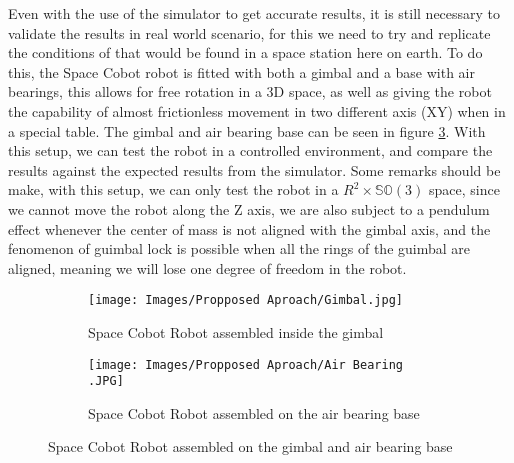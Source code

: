 Even with the use of the simulator to get accurate results, it is still necessary to validate the results in real world scenario, for this we need to try and replicate the conditions of that would be found in a space station here on earth. To do this, the Space Cobot robot is fitted with both a gimbal and a base with air bearings, this allows for free rotation in a 3D space, as well as giving the robot the capability of almost frictionless movement in two different axis (XY) when in a special table. The gimbal and air bearing base can be seen in figure \ref{fig:Proposed Approach: Real World: Gimbal and Air bearing base}. With this setup, we can test the robot in a controlled environment, and compare the results against the expected results from the simulator. Some remarks should be make, with this setup, we can only test the robot in a $R^2 \times \mathbb{SO}(3)$ space, since we cannot move the robot along the Z axis, we are also subject to a pendulum effect whenever the center of mass is not aligned with the gimbal axis, and the fenomenon of guimbal lock is possible when all the rings of the guimbal are aligned, meaning we will lose one degree of freedom in the robot.

\begin{figure}[H]
    \begin{subfigure}{0.5\textwidth}
       \centering
       \texttt{[image: Images/Propposed Aproach/Gimbal.jpg]} 
       \caption{Space Cobot Robot assembled inside the gimbal}
       \label{fig: Proposed Approach: Real World: Gimbal}
    \end{subfigure}
    \hfill
    \begin{subfigure}{.5\textwidth}
        \centering
        \texttt{[image: Images/Propposed Aproach/Air Bearing .JPG]}
        \caption{Space Cobot Robot assembled on the air bearing base}
        \label{fig: Proposed Approach: Real Word: Air Bearings}
    \end{subfigure}
    \caption{Space Cobot Robot assembled on the gimbal and air bearing base}
    \label{fig:Proposed Approach: Real World: Gimbal and Air bearing base}
\end{figure}